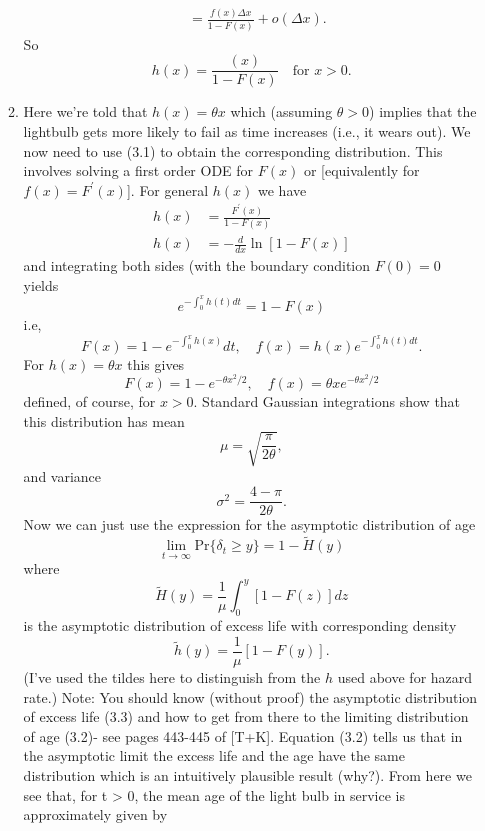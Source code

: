 \documentclass[11pt,a4paper]{article}
\begin{document}
\begin{enumerate}
\begin{enumerate}
\begin{align*}
        &= \frac{f(x)\Delta x}{1 - F(x)} + o(\Delta x).
      \end{align*}
      So
      \begin{equation}\tag{3.1}
        h(x) = \frac{(x)}{1 - F(x)}\quad \text{for $x > 0$}.
      \end{equation}
      \item Here we're told that $h(x) = \theta x$ which (assuming $\theta > 0$) implies that the lightbulb gets more likely to fail as time increases (i.e., it wears out). We now need to use (3.1) to obtain the corresponding distribution. This involves solving a first order ODE for $F(x)$ or [equivalently for $f(x) = F^\prime(x)$]. For general $h(x)$ we have
      \begin{align*}
        h(x) &= \frac{F^\prime(x)}{1 - F(x)}\\
        h(x) &= -\frac{d}{dx}\ln[1 - F(x)]
      \end{align*}
      and integrating both sides (with the boundary condition $F(0) = 0$ yields
      $$
      e^{-\int_0^xh(t)dt} = 1 - F(x)
      $$
      i.e,
      $$
      F(x) = 1- e^{-\int_0^xh(x)}dt,\quad f(x) = h(x)e^{-\int_0^xh(t)dt}.
      $$
      For $h(x) = \theta x$ this gives
      $$
      F(x) = 1 - e^{-\theta x^2/2},\quad f(x) = \theta x e^{-\theta x^2/2}
      $$
      defined, of course, for $x > 0$. Standard Gaussian integrations show that this distribution has mean
      $$
      \mu = \sqrt{\frac{\pi}{2\theta}},
      $$
      and variance
      $$
      \sigma^2 = \frac{4 - \pi}{2\theta}.
      $$
      Now we can just use the expression for the asymptotic distribution of age
      \begin{equation}\tag{3.2}
        \lim_{t \to\infty}\text{Pr}\{\delta_t \geq y\} = 1 - \tilde{H}(y)
      \end{equation}
      where
      \begin{equation}\tag{3.3}
        \tilde{H}(y) = \frac{1}{\mu}\int_0^y[1 - F(z)]dz
      \end{equation}
      is the asymptotic distribution of excess life with corresponding density
      $$
      \tilde{h}(y) = \frac{1}{\mu}[1 - F(y)].
      $$
      (I've used the tildes here to distinguish from the $h$ used above for hazard rate.) Note: You should know (without proof) the asymptotic distribution of excess life (3.3) and how to get from there to the limiting distribution of age (3.2)- see pages 443-445 of [T+K]. Equation (3.2) tells us that in the asymptotic limit the excess life and the age have the same distribution which is an intuitively plausible result (why?). From here we see that, for t > 0, the mean age of the light bulb in service is approximately given by

\end{enumerate}
\end{enumerate}
\end{document}

